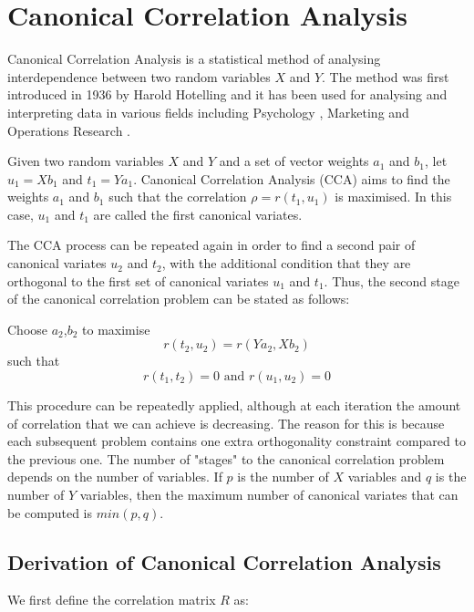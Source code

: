 \section{Canonical Correlation Analysis}
\label{cca_background}

Canonical Correlation Analysis is a statistical method of analysing interdependence 
between two random variables $X$ and $Y$. The method was first introduced in 1936 by 
Harold Hotelling \cite{hotelling1936relations} and it has been used for 
analysing and interpreting data in various fields including 
Psychology \cite{cooley1971multivariate}, Marketing \cite{fader1990cross} and 
Operations Research \cite{pisharodi1991interset}.

Given two random variables $X$ and $Y$ and a set of vector weights $a_1$ and $b_1$, 
let $u_1 = Xb_1$ and $t_1 = Ya_1$. Canonical Correlation Analysis (CCA) aims to 
find the weights $a_1$ and $b_1$ such that the correlation $ \rho = r(t_1, u_1) $
is maximised. In this case, $u_1$ and $t_1$ are called the first canonical variates. 

The CCA process can be repeated again in order to find a second pair of canonical 
variates $u_2$ and $t_2$, with the additional condition that they are orthogonal to the first set 
of canonical variates $u_1$ and $t_1$. Thus, the second stage of the canonical correlation problem 
can be stated as follows:

Choose $a_2$,$b_2$ to maximise 
\begin{equation}
r(t_2, u_2) = r(Ya_2, Xb_2)
\end{equation}
such that 
$$r(t_1, t_2) = 0 \text{ and } r(u_1, u_2) = 0$$

This procedure can be repeatedly applied, although at each iteration the amount of correlation that we can achieve is decreasing. The reason for this is because each subsequent problem contains one extra orthogonality constraint compared to the previous one. The number of "stages" to the canonical correlation problem depends on the number of variables. 
If $p$ is the number of $X$ variables and $q$ is the number of $Y$ variables, then the maximum 
number of canonical variates that can be computed is $min(p,q)$.

\subsection{Derivation of Canonical Correlation Analysis}

We first define the correlation matrix $R$ as:

